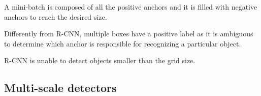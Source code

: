 \begin{description}
\begin{description}
\begin{description}
                    A mini-batch is composed of all the positive anchors and it is filled with negative anchors to reach the desired size.

                    \begin{remark}
                        Differently from R-CNN, multiple boxes have a positive label as it is ambiguous to determine which anchor is responsible for recognizing a particular object.
                    \end{remark}
            \end{description}
        \end{description}
\end{description} 

\begin{remark}
    R-CNN is unable to detect objects smaller than the grid size.
\end{remark}


\subsection{Multi-scale detectors}

